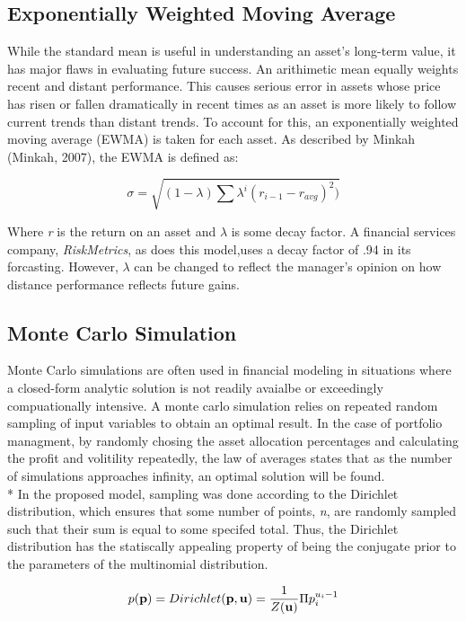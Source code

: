 \documentclass[12pt]{article}
\begin{document}
\subsection{Exponentially Weighted Moving Average}
While the standard mean is useful in understanding an asset's long-term value, it has major flaws in evaluating future success. An arithimetic mean equally weights recent and distant performance. This causes serious error in assets whose price has risen or fallen dramatically in recent times as an asset is more likely to follow current trends than distant trends. To account for this, an exponentially weighted moving average (EWMA) is taken for each asset. As described by Minkah (Minkah, 2007), the EWMA is defined as:

\begin{equation}
	\sigma = \sqrt{(1-\lambda) \sum{ \lambda^{i}(r_{i-1} - r_{avg})^2})}
\end{equation}

Where \emph{r} is the return on an asset and $\lambda$ is some decay factor. A financial services company, \emph{RiskMetrics}, as does this model,uses a decay factor of .94 in its forcasting. However, $\lambda$ can be changed to reflect the manager's opinion on how distance performance reflects future gains. 

\subsection{Monte Carlo Simulation}
Monte Carlo simulations are often used in financial modeling in situations where a closed-form analytic solution is not readily avaialbe or exceedingly compuationally intensive. A monte carlo simulation relies on repeated random sampling of input variables to obtain an optimal result. In the case of portfolio managment, by randomly chosing the asset allocation percentages and calculating the profit and volitility repeatedly, the law of averages states that as the number of simulations approaches infinity, an optimal solution will be found. \\*
In the proposed model, sampling was done according to the Dirichlet distribution, which ensures that some number of points, \emph{n}, are randomly sampled such that their sum is equal to some specifed total. Thus, the Dirichlet distribution has the statiscally appealing property of being the conjugate prior to the parameters of the multinomial distribution. 

\begin{equation}
	p({\bf p}) = Dirichlet({\bf p, u}) = \frac{1}{Z({\bf u})} \Pi p_{i}^{u_{i}-1}
\end{equation}
\end{document}

